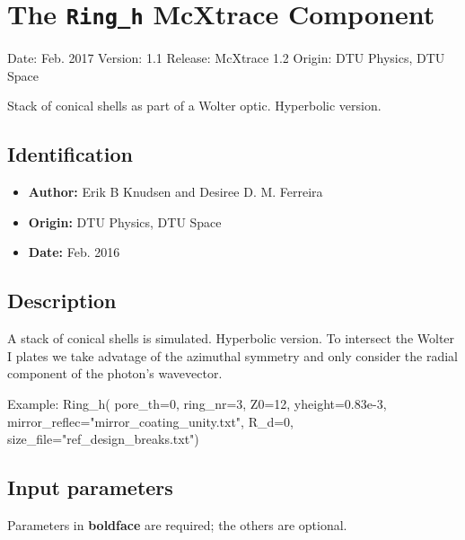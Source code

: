 \section{The \texttt{Ring\_h} McXtrace Component}
Date: Feb. 2017
Version: 1.1
Release: McXtrace 1.2
Origin: DTU Physics, DTU Space

Stack of conical shells as part of a Wolter optic. Hyperbolic version.

\subsection*{Identification}
\begin{itemize}
  \item \textbf{Author:} Erik B Knudsen and Desiree D. M. Ferreira
  \item \textbf{Origin:} DTU Physics, DTU Space
  \item \textbf{Date:} Feb. 2016
\end{itemize}

\subsection*{Description}
A stack of conical shells is simulated. Hyperbolic version. To intersect the Wolter I plates we take advatage of the azimuthal symmetry and only consider the radial component of the photon's wavevector.

Example: Ring\_h( pore\_th=0, ring\_nr=3, Z0=12, yheight=0.83e-3, mirror\_reflec="mirror\_coating\_unity.txt", R\_d=0, size\_file="ref\_design\_breaks.txt")

\subsection*{Input parameters}
Parameters in \textbf{boldface} are required; the others are optional.

